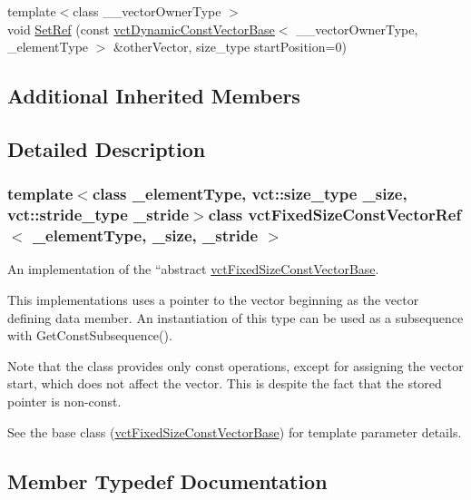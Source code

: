 \begin{DoxyCompactItemize}
\item 
{\footnotesize template$<$class \+\_\+\+\_\+vector\+Owner\+Type $>$ }\\void \hyperlink{classvct_fixed_size_const_vector_ref_aa1350bde6a5da6b105ad199b730f4d24}{Set\+Ref} (const \hyperlink{classvct_dynamic_const_vector_base}{vct\+Dynamic\+Const\+Vector\+Base}$<$ \+\_\+\+\_\+vector\+Owner\+Type, \+\_\+element\+Type $>$ \&other\+Vector, size\+\_\+type start\+Position=0)
\end{DoxyCompactItemize}
\subsection*{Additional Inherited Members}


\subsection{Detailed Description}
\subsubsection*{template$<$class \+\_\+element\+Type, vct\+::size\+\_\+type \+\_\+size, vct\+::stride\+\_\+type \+\_\+stride$>$class vct\+Fixed\+Size\+Const\+Vector\+Ref$<$ \+\_\+element\+Type, \+\_\+size, \+\_\+stride $>$}

An implementation of the ``abstract\textquotesingle{}\textquotesingle{} \hyperlink{classvct_fixed_size_const_vector_base}{vct\+Fixed\+Size\+Const\+Vector\+Base}. 

This implementations uses a pointer to the vector beginning as the vector defining data member. An instantiation of this type can be used as a subsequence with Get\+Const\+Subsequence().

Note that the class provides only const operations, except for assigning the vector start, which does not affect the vector. This is despite the fact that the stored pointer is non-\/const.

See the base class (\hyperlink{classvct_fixed_size_const_vector_base}{vct\+Fixed\+Size\+Const\+Vector\+Base}) for template parameter details. 

\subsection{Member Typedef Documentation}
\hypertarget{classvct_fixed_size_const_vector_ref_a669fc6db8058bda695431756ce54f59d}{}
